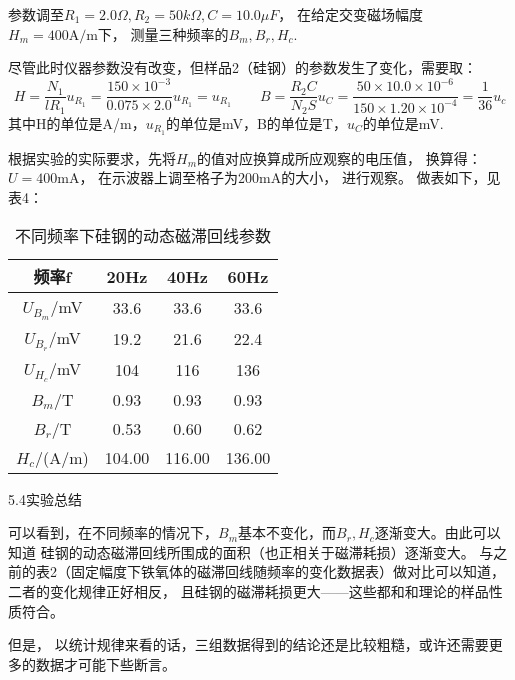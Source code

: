 \documentclass[11pt]{article}
\begin{document}
参数调至$R_1=2.0\Omega,R_2=50k\Omega,C=10.0\mu F$，
在给定交变磁场幅度$H_m=400\text{A}/\text{m}$下，
测量三种频率的$B_m,B_r,H_c$.

尽管此时仪器参数没有改变，但样品2（硅钢）的参数发生了变化，需要取：
\[
    H=\frac{N_1}{l R_1}u_{R_1}=\frac{150\times 10^{-3}}{0.075\times 2.0}u_{R_1}=u_{R_1}\qquad
    B = \frac{R_2 C}{N_2 S}u_C=\frac{50\times 10.0\times 10^{-6}}{150\times 1.20\times 10^{-4}}=\frac{1}{36}u_c
\]
其中H的单位是A/m，$u_{R_1}$的单位是mV，B的单位是T，$u_C$的单位是mV.

根据实验的实际要求，先将$H_m$的值对应换算成所应观察的电压值，
换算得：$U=400\text{mA}$，
在示波器上调至格子为$200\text{mA}$的大小，
进行观察。
\newpage
做表如下，见表4：

\begin{table}[H]
    \centering
    \begin{tabular}{cccc}
        \toprule
        频率f & 20Hz & 40Hz & 60Hz \\ \midrule
        $U_{B_m}$/mV & 33.6 & 33.6 & 33.6 \\ 
        $U_{B_r}$/mV  & 19.2 & 21.6 & 22.4 \\ 
        $U_{H_c}$/mV  & 104 & 116 & 136 \\ \midrule
        $B_m$/T & 0.93  & 0.93  & 0.93  \\ 
        $B_r$/T& 0.53  & 0.60  & 0.62  \\ 
        $H_c$/(A/m) & 104.00  & 116.00  & 136.00 \\ 
        \bottomrule
    \end{tabular}
    \caption{不同频率下硅钢的动态磁滞回线参数}
\end{table}

\begin{center}
    \large{5.4实验总结}
\end{center}

可以看到，在不同频率的情况下，$B_m$基本不变化，而$B_r,H_c$逐渐变大。由此可以知道
硅钢的动态磁滞回线所围成的面积（也正相关于磁滞耗损）逐渐变大。
与之前的表2（固定幅度下铁氧体的磁滞回线随频率的变化数据表）做对比可以知道，二者的变化规律正好相反，
且硅钢的磁滞耗损更大——这些都和和理论的样品性质符合。

但是，
以统计规律来看的话，三组数据得到的结论还是比较粗糙，或许还需要更多的数据才可能下些断言。
\end{document}
